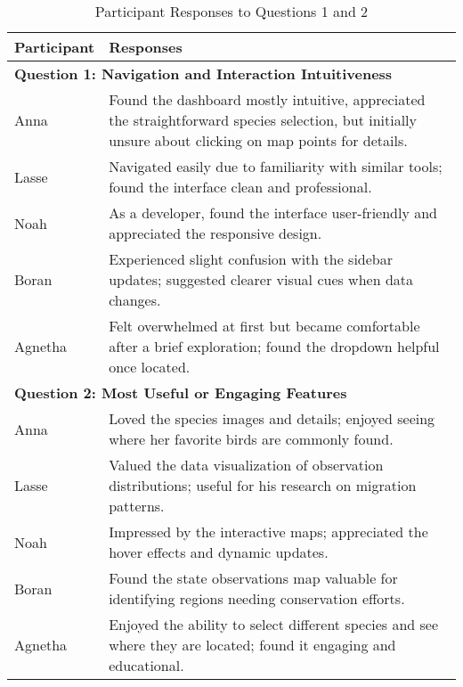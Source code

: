 \begin{table}[H]
    \centering
    \begin{tabular}{p{3cm} | p{12cm}}
        \hline
        \textbf{Participant} & \textbf{Responses} \\
        \hline
        \multicolumn{2}{l}{\textbf{Question 1: Navigation and Interaction Intuitiveness}} \\
        \hline
        Anna & Found the dashboard mostly intuitive, appreciated the straightforward species selection, but initially unsure about clicking on map points for details. \\
        \hline
        Lasse & Navigated easily due to familiarity with similar tools; found the interface clean and professional. \\
        \hline
        Noah & As a developer, found the interface user-friendly and appreciated the responsive design. \\
        \hline
        Boran & Experienced slight confusion with the sidebar updates; suggested clearer visual cues when data changes. \\
        \hline
        Agnetha & Felt overwhelmed at first but became comfortable after a brief exploration; found the dropdown helpful once located. \\
        \hline
        \multicolumn{2}{l}{\textbf{Question 2: Most Useful or Engaging Features}} \\
        \hline
        Anna & Loved the species images and details; enjoyed seeing where her favorite birds are commonly found. \\
        \hline
        Lasse & Valued the data visualization of observation distributions; useful for his research on migration patterns. \\
        \hline
        Noah & Impressed by the interactive maps; appreciated the hover effects and dynamic updates. \\
        \hline
        Boran & Found the state observations map valuable for identifying regions needing conservation efforts. \\
        \hline
        Agnetha & Enjoyed the ability to select different species and see where they are located; found it engaging and educational. \\
        \hline
    \end{tabular}
    \caption{Participant Responses to Questions 1 and 2}
    \label{tab:responses1}
\end{table}

